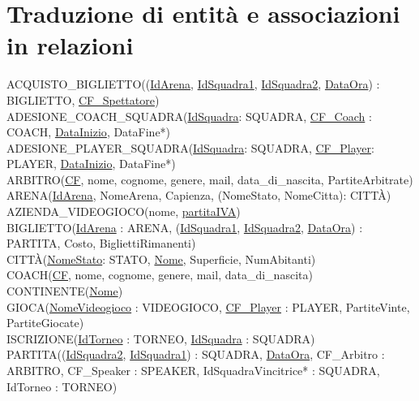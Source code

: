 \documentclass[a4paper,12pt]{report}
\begin{document}
\section{Traduzione di entità e associazioni in relazioni}

ACQUISTO\_BIGLIETTO((\underline{IdArena}, \underline{IdSquadra1}, \underline{IdSquadra2}, \underline{DataOra}) : BIGLIETTO, \underline{CF\_Spettatore}) \\

\noindent ADESIONE\_COACH\_SQUADRA(\underline{IdSquadra}: SQUADRA, \underline{CF\_Coach} : COACH, \underline{DataInizio}, DataFine*) \\

\noindent ADESIONE\_PLAYER\_SQUADRA(\underline{IdSquadra}: SQUADRA, \underline{CF\_Player}: PLAYER, \underline{DataInizio}, DataFine*) \\

\noindent ARBITRO(\underline{CF}, nome, cognome, genere, mail,  data\_di\_nascita, PartiteArbitrate) \\

\noindent ARENA(\underline{IdArena}, NomeArena, Capienza, (NomeStato, NomeCitta): CITTÀ) \\

\noindent AZIENDA\_VIDEOGIOCO(nome, \underline{partitaIVA}) \\

\noindent BIGLIETTO(\underline{IdArena} : ARENA, (\underline{IdSquadra1}, \underline{IdSquadra2}, \underline{DataOra}) : PARTITA, Costo, BigliettiRimanenti) \\

\noindent CITTÀ(\underline{NomeStato}: STATO, \underline{Nome}, Superficie, NumAbitanti) \\

\noindent COACH(\underline{CF}, nome, cognome, genere, mail, data\_di\_nascita) \\

\noindent CONTINENTE(\underline{Nome}) \\

\noindent GIOCA(\underline{NomeVideogioco} : VIDEOGIOCO, \underline{CF\_Player} : PLAYER, PartiteVinte, PartiteGiocate) \\

\noindent ISCRIZIONE(\underline{IdTorneo} : TORNEO, \underline{IdSquadra} : SQUADRA) \\

\noindent PARTITA((\underline{IdSquadra2}, \underline{IdSquadra1}) : SQUADRA, \underline{DataOra}, CF\_Arbitro : ARBITRO, CF\_Speaker : SPEAKER, IdSquadraVincitrice* : SQUADRA, IdTorneo : TORNEO) \\
\end{document}
